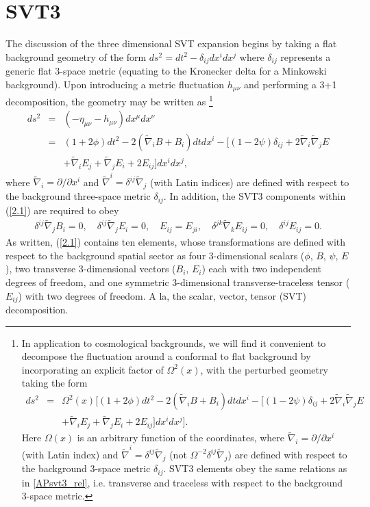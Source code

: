 \section{SVT3}
\label{s:svt3}
%
The discussion of the three dimensional SVT expansion begins by taking a flat background geometry of the form $ds^2=dt^2-\delta_{ij}dx^idx^j$ where $\delta_{ij}$ represents a generic flat 3-space metric (equating to the Kronecker delta for a Minkowski background). Upon introducing a metric fluctuation $h_{\mu\nu}$ and performing a 3+1 decomposition, the geometry may be written as
%
	\footnote{In application to cosmological backgrounds, we will find it convenient to decompose the fluctuation around a conformal to flat background by incorporating an explicit factor of $\Omega^2(x)$, with the perturbed geometry taking the form
	\begin{eqnarray}
	ds^2 &=& \Omega^2(x) \bigg[ (1+2\phi) dt^2 -2(\tilde{\nabla}_i B +B_i)dt dx^i - [(1-2\psi)\delta_{ij} +2\tilde{\nabla}_i\tilde{\nabla}_j E
	\nonumber\\
	&& + \tilde{\nabla}_i E_j + \tilde{\nabla}_j E_i + 2E_{ij}]dx^i dx^j\bigg].
	\label{AP62}
	\end{eqnarray}
	Here $\Omega(x)$ is an arbitrary function of the coordinates, where $\tilde{\nabla}_i=\partial/\partial x^i$ (with Latin index) and  $\tilde{\nabla}^i=\delta^{ij}\tilde{\nabla}_j$ (not $\Omega^{-2}\delta^{ij}\tilde{\nabla}_j$) are defined with respect to the background 3-space metric $\delta_{ij}$. SVT3 elements obey the same relations as in \eqref{APsvt3_rel}, i.e. transverse and traceless with respect to the background 3-space metric.}
%
\begin{eqnarray}
ds^2 &=&(-\eta_{\mu\nu}-h_{\mu\nu})dx^{\mu}dx^{\nu}
\nonumber\\
&=&(1+2\phi) dt^2 -2(\tilde{\nabla}_i B +B_i)dt dx^i - [(1-2\psi)\delta_{ij} +2\tilde{\nabla}_i\tilde{\nabla}_j E 
\nonumber\\
&&+ \tilde{\nabla}_i E_j + \tilde{\nabla}_j E_i + 2E_{ij}]dx^i dx^j,
\label{2.1}
\end{eqnarray}
%
where $\tilde{\nabla}_i=\partial/\partial x^i$ and  $\tilde{\nabla}^i=\delta^{ij}\tilde{\nabla}_j$  (with Latin indices) are defined with respect to the background three-space metric $\delta_{ij}$. In addition, the SVT3 components within (\ref{2.1}) are required to obey
%
\begin{eqnarray}
\delta^{ij}\tilde{\nabla}_j B_i = 0,\quad \delta^{ij}\tilde{\nabla}_j E_i = 0, \quad E_{ij}=E_{ji},\quad \delta^{jk}\tilde{\nabla}_kE_{ij} = 0, \quad \delta^{ij}E_{ij} = 0.
\label{2.2}
\label{APsvt3_rel}
\end{eqnarray}
%
As written, (\ref{2.1}) contains ten elements, whose transformations are defined with respect to the background spatial sector as four 3-dimensional scalars ($\phi$, $B$, $\psi$, $E$), two transverse 3-dimensional vectors ($B_i$, $E_i$) each with two independent degrees of freedom, and one symmetric 3-dimensional transverse-traceless tensor ($E_{ij}$) with two degrees of freedom. A la, the scalar, vector, tensor (SVT) decomposition. 

